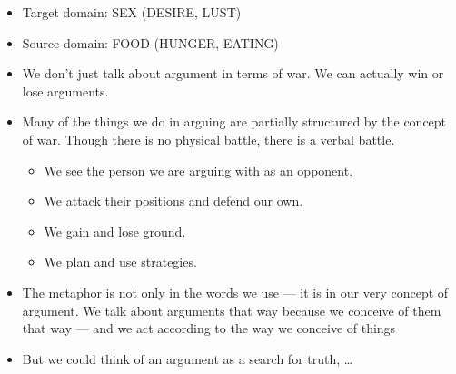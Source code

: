 \documentclass[a4paper,landscape,headrule,footrule,xetex]{foils}
\begin{document}
\begin{exe}
  \ex {}  
  \ex {}
  \ex {} 
  \ex {}
  \ex {}
\end{exe}
\begin{itemize}
\item Target domain: SEX (DESIRE, LUST)
\item Source domain: FOOD (HUNGER, EATING)
\end{itemize}



\begin{exe}
\ex {}
\ex {}
\ex {}
\ex {}
\ex {}
\ex {}
\ex {}
\ex {}
\ex {}
\end{exe}
\newpage
\begin{itemize}
\item We don't just talk about argument in terms of war. We can actually win or
lose arguments.
\item  Many of the things we do in arguing are partially structured by the concept of war.
Though there is no physical battle, there is a verbal battle.
\begin{itemize}
  \item  We see the person we are arguing with as an opponent.
  \item  We attack their positions and defend our own.
  \item  We gain and lose ground.
  \item  We plan and use strategies.
 \end{itemize}

\item The metaphor is not only in the words we use --- it is in our very concept of argument.  We talk about arguments that way because we conceive of them that way --- and we
act according to the way we conceive of things
\item But we could think of an argument as a search for truth, \ldots
\end{itemize}

\end{document}
